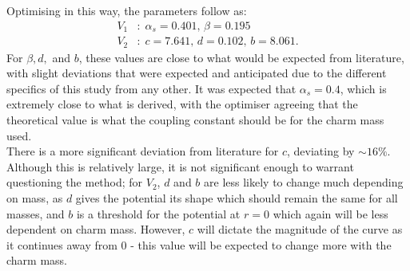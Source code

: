 \documentclass[10pt, twocolumn]{article}
\begin{document}
Optimising in this way, the parameters follow as:
\begin{align}
    V_1 &:\; \alpha_s = 0.401,\, \beta = 0.195 \\
    V_2 &:\; c = 7.641,\, d = 0.102,\, b = 8.061.
\end{align}
For $\beta,d,$ and $b$, these values are close to what would be expected from literature, with slight deviations that were expected and anticipated due to the different specifics of this study from any other. 
It was expected that $\alpha_s = 0.4$, which is extremely close to what is derived, with the optimiser agreeing that the theoretical value is what the coupling constant should be for the charm mass used.\\
There is a more significant deviation from literature for $c$, deviating by $\sim 16\%$.
Although this is relatively large, it is not significant enough to warrant questioning the method; for $V_2$, $d$ and $b$ are less likely to change much depending on mass, as $d$ gives the potential its shape which should remain the same for all masses, and $b$ is a threshold for the potential at $r=0$ which again will be less dependent on charm mass. 
However, $c$ will dictate the magnitude of the curve as it continues away from 0 - this value will be expected to change more with the charm mass. 
\end{document}

